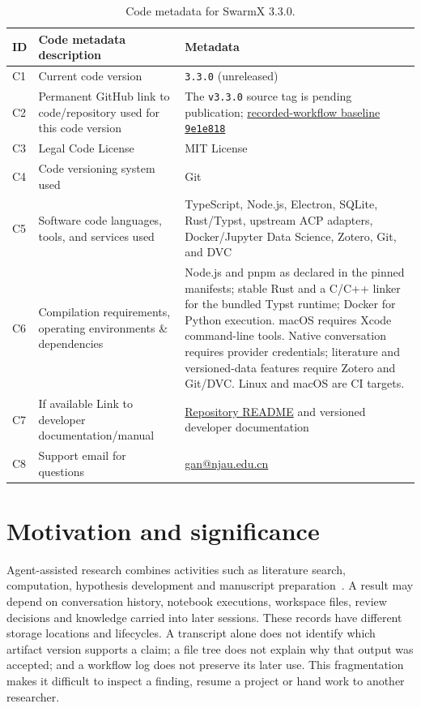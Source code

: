 \documentclass[preprint,12pt,a4paper]{elsarticle}
\begin{document}
\begin{table}[H]
\centering
\caption{Code metadata for SwarmX 3.3.0.}
\label{tab:code-metadata}
\footnotesize
\renewcommand{\arraystretch}{1.08}
\begin{tabularx}{\textwidth}{@{}p{}p{}Y@{}}
\toprule
\textbf{ID} & \textbf{Code metadata description} & \textbf{Metadata} \\
\midrule
C1 & Current code version & \texttt{3.3.0} (unreleased) \\
C2 & Permanent GitHub link to code/repository used for this code version &
The \texttt{v3.3.0} source tag is pending publication;
\href{https://github.com/tcztzy/swarmx/tree/9e1e818acd438dcbf30fb9dc46d758495d24d094}{recorded-workflow baseline \texttt{9e1e818}} \\
C3 & Legal Code License & MIT License \\
C4 & Code versioning system used & Git \\
C5 & Software code languages, tools, and services used & TypeScript, Node.js, Electron, SQLite, Rust/Typst, upstream ACP adapters, Docker/Jupyter Data Science, Zotero, Git, and DVC \\
C6 & Compilation requirements, operating environments \& dependencies & Node.js and pnpm as declared in the pinned manifests; stable Rust and a C/C++ linker for the bundled Typst runtime; Docker for Python execution. macOS requires Xcode command-line tools. Native conversation requires provider credentials; literature and versioned-data features require Zotero and Git/DVC. Linux and macOS are CI targets. \\
C7 & If available Link to developer documentation/manual & \href{https://github.com/tcztzy/swarmx}{Repository README} and versioned developer documentation \\
C8 & Support email for questions & \href{mailto:gan@njau.edu.cn}{gan@njau.edu.cn} \\
\bottomrule
\end{tabularx}
\end{table}

\section{Motivation and significance}
\label{sec:motivation}

Agent-assisted research combines activities such as literature search, computation, hypothesis
development and manuscript preparation~\cite{lu2026,gottweis2026,swanson2025}. A result may depend
on conversation history, notebook executions, workspace files, review decisions and knowledge
carried into later sessions. These records have different storage locations and lifecycles.
A transcript alone does not identify which artifact version supports a claim; a file tree does
not explain why that output was accepted; and a workflow log does not preserve its later use.
This fragmentation makes it difficult to inspect a finding, resume a project or hand work
to another researcher.
\end{document}
